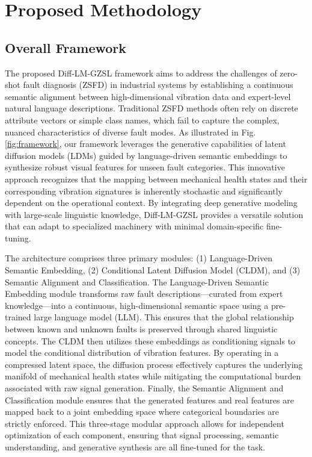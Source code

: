 \section{Proposed Methodology}
\label{sec:method}
\subsection{Overall Framework}
\label{sec:framework}
The proposed Diff-LM-GZSL framework aims to address the challenges of zero-shot fault diagnosis (ZSFD) in industrial systems by establishing a continuous semantic alignment between high-dimensional vibration data and expert-level natural language descriptions. Traditional ZSFD methods often rely on discrete attribute vectors or simple class names, which fail to capture the complex, nuanced characteristics of diverse fault modes. As illustrated in Fig. \ref{fig:framework}, our framework leverages the generative capabilities of latent diffusion models (LDMs) guided by language-driven semantic embeddings to synthesize robust visual features for unseen fault categories. This innovative approach recognizes that the mapping between mechanical health states and their corresponding vibration signatures is inherently stochastic and significantly dependent on the operational context. By integrating deep generative modeling with large-scale linguistic knowledge, Diff-LM-GZSL provides a versatile solution that can adapt to specialized machinery with minimal domain-specific fine-tuning.

The architecture comprises three primary modules: (1) Language-Driven Semantic Embedding, (2) Conditional Latent Diffusion Model (CLDM), and (3) Semantic Alignment and Classification. The Language-Driven Semantic Embedding module transforms raw fault descriptions—curated from expert knowledge—into a continuous, high-dimensional semantic space using a pre-trained large language model (LLM). This ensures that the global relationship between known and unknown faults is preserved through shared linguistic concepts. The CLDM then utilizes these embeddings as conditioning signals to model the conditional distribution of vibration features. By operating in a compressed latent space, the diffusion process effectively captures the underlying manifold of mechanical health states while mitigating the computational burden associated with raw signal generation. Finally, the Semantic Alignment and Classification module ensures that the generated features and real features are mapped back to a joint embedding space where categorical boundaries are strictly enforced. This three-stage modular approach allows for independent optimization of each component, ensuring that signal processing, semantic understanding, and generative synthesis are all fine-tuned for the task.

